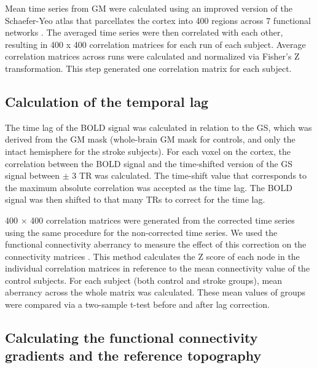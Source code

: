 \documentclass[fleqn,10pt]{wlscirep}
\begin{document}
Mean time series from GM were calculated using an improved version of the Schaefer-Yeo atlas that parcellates the cortex into 400 regions across 7 functional networks \citep{Schaefer_2017, glen2021improved}. The averaged time series were then correlated with each other, resulting in 400 x 400 correlation matrices for each run of each subject. Average correlation matrices across runs were calculated and normalized via Fisher's Z transformation. This step generated one correlation matrix for each subject.

\subsection*{Calculation of the temporal lag}
The time lag of the BOLD signal was calculated in relation to the GS, which was derived from the GM mask (whole-brain GM mask for controls, and only the intact hemisphere for the stroke subjects). For each voxel on the cortex, the correlation between the BOLD signal and the time-shifted version of the GS signal between $\pm$ 3 TR was calculated. The time-shift value that corresponds to the maximum absolute correlation was accepted as the time lag. The BOLD signal was then shifted to that many TRs to correct for the time lag. 

400 $\times$ 400 correlation matrices were generated from the corrected time series using the same procedure for the non-corrected time series. We used the functional connectivity aberrancy to measure the effect of this correction on the connectivity matrices \citep{siegel2016effects}. This method calculates the Z score of each node in the individual correlation matrices in reference to the mean connectivity value of the control subjects. For each subject (both control and stroke groups), mean aberrancy across the whole matrix was calculated. These mean values of groups were compared via a two-sample t-test before and after lag correction.


\subsection*{Calculating the functional connectivity gradients and the reference topography}
 
\end{document}
